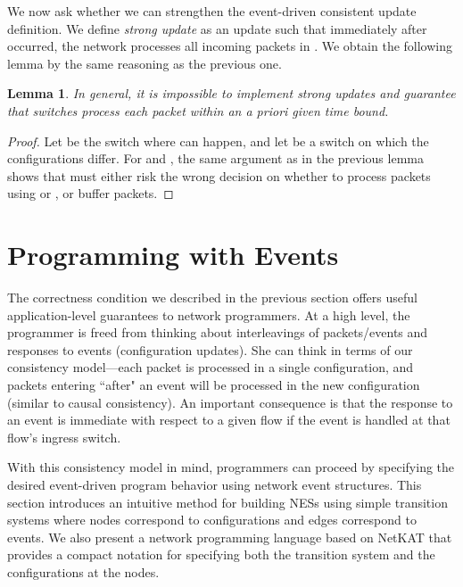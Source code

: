 \documentclass[pldi-cameraready]{sigplanconf}
\newtheorem{lemma}{Lemma}
\begin{document}
\noindent We now ask whether we can strengthen the event-driven
consistent update definition. We define {\em strong update} as an
update  such that immediately after 
 occurred, the network processes all incoming packets in . We
obtain the following lemma by the same reasoning as the previous one.
\begin{lemma}
\label{lem:packet}
In general, it is impossible to implement strong updates and guarantee that
switches process each packet within an {a priori} given time bound.
\end{lemma}
\begin{proof}
Let  be the switch where  can happen, and let  be a switch
on which the configurations  differ. For  and ,
the same argument as in the previous lemma shows that  must
either risk the wrong decision on whether to process packets using
 or , or buffer packets.
\end{proof}


\renewcommand*{\proofname}{Proof}







\section{Programming with Events}
\label{sec:model}
The correctness condition we described in the previous section
offers useful application-level guarantees to network programmers.
 At a high level, the programmer is freed from thinking about 
  interleavings of packets/events and responses to events
  (configuration updates). She can think in terms of our consistency
  model---each packet is processed in a single configuration,
  and packets entering ``after" an event will be processed in the new
  configuration (similar to causal consistency). An important consequence is that the response to an event is immediate with respect to a
  given flow if the event is handled at that flow's ingress switch.

With this consistency model in mind, programmers can proceed by
specifying the desired event-driven program behavior using network
event structures. This section introduces an intuitive method for building NESs using
simple transition systems where nodes correspond to configurations and edges
correspond to events. We also present a network programming language
based on NetKAT that provides a compact notation for specifying both the
transition system and the configurations at the nodes.
\end{document}
